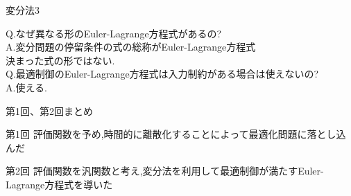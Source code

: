 \documentclass[twocolumn, dvipdfmx,12pt]{beamer}
\begin{document}
    \begin{frame}{変分法3}
        \fontsize{9.5pt}{9.5pt}\selectfont

        Q.\quad なぜ異なる形のEuler-Lagrange方程式があるの? \\
        A.\quad 変分問題の停留条件の式の総称がEuler-Lagrange方程式\\
                \qquad 決まった式の形ではない.\\

        \vspace{1em}
        Q.\quad 最適制御のEuler-Lagrange方程式は入力制約がある場合は使えないの?\\
        A.\quad 使える.
    \end{frame}
    \begin{frame}{第1回、第2回まとめ}
        \begin{itembox}[l]{第1回}
            評価関数を予め,時間的に離散化することによって最適化問題に落とし込んだ
        \end{itembox}
        \begin{itembox}[l]{第2回}
            評価関数を汎関数と考え,変分法を利用して最適制御が満たすEuler-Lagrange方程式を導いた
        \end{itembox}
    \end{frame}
\end{document}
